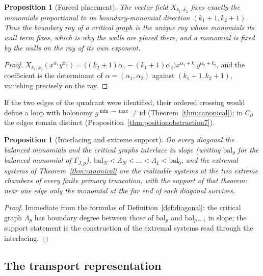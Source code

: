 \documentclass[11pt]{amsart}
\newtheorem{proposition}[theorem]{Proposition}
\theoremstyle{definition}
\theoremstyle{remark}
\begin{document}
\begin{proposition}[Forced placement]
\label{prop:placement}
The vector field $X_{k_{1},k_{2}}$ fixes exactly the monomials proportional to
its boundary-monomial direction $(k_{1}{+}1,k_{2}{+}1)$.  Thus the boundary
ray of a critical graph is the unique ray whose monomials its wall term
fixes, which is why the walls are placed there, and a monomial is fixed by the
walls on the ray of its own exponent.
\end{proposition}

\begin{proof}
$X_{k_{1},k_{2}}(x^{\alpha_1}y^{\alpha_2})=\bigl((k_{2}{+}1)\alpha_1
-(k_{1}{+}1)\alpha_2\bigr)x^{\alpha_1+k_{1}}y^{\alpha_2+k_{2}}$, and the
coefficient is the determinant of $\alpha=(\alpha_1,\alpha_2)$ against
$(k_{1}{+}1,k_{2}{+}1)$, vanishing precisely on the ray.
\end{proof}

If the two edges of the quadrant were identified, their ordered crossing would
define a loop with holonomy $g^{\min\to\max}\ne\mathrm{id}$
(Theorem~\ref{thm:canonical}); in $C_\partial$ the edges remain distinct
(Proposition~\ref{thm:positionobstruction7}).

\begin{proposition}[Interlacing and extreme support]
\label{prop:interlace}
On every diagonal the balanced monomials and the critical graphs interlace in
slope (writing $\mathrm{bal}_{p}$ for the balanced monomial of $\Gamma_{J,p}$),
$\mathrm{bal}_{N}<\Lambda_{N}<\dots<\Lambda_{1}<\mathrm{bal}_{0}$, and the
extremal systems of Theorem~\ref{thm:canonical} are the realizable systems at
the two extreme chambers of every finite primary truncation, with the support
of that theorem: near one edge only the monomial at the far end of each
diagonal survives.
\end{proposition}

\begin{proof}
Immediate from the formulas of Definition~\ref{def:diagonal}: the critical
graph $\Lambda_{p}$ has boundary degree between those of $\mathrm{bal}_{p}$ and
$\mathrm{bal}_{p-1}$ in slope; the support statement is the construction of
the extremal systems read through the interlacing.
\end{proof}



\subsection{The transport representation}
\label{ssec:transport}
\end{document}
